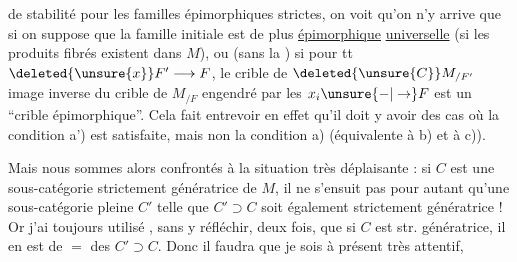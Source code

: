 de stabilité pour les familles épimorphiques
strictes, on voit qu'on n'y arrive que
si on suppose que la famille initiale
est de plus \uline{épimorphique} \uline{universelle}
(si les produits fibrés existent dans $M$),
ou (sans la  ) si  pour
tt $\deleted{\unsure{x}}F'\longrightarrow F$, le crible de $\deleted{\unsure{C}}M_{/F'}$ image
inverse du crible de $M_{/F}$ engendré par
les $x_i\unsure{\mathord{-}|\to}F$ est un ``crible épimorphique''.
 Cela fait entrevoir en effet qu'il doit
y avoir des cas où la condition a') est
satisfaite, mais non la condition a)
(équivalente à b) et à c)).

Mais nous sommes alors confrontés
à la situation très déplaisante : si $C$ est
une sous-catégorie strictement génératrice de
$M$, il ne s'ensuit pas pour autant qu'une
sous-catégorie pleine $C'$   telle que $C'\supset C$
soit également strictement génératrice !
Or j'ai toujours utilisé , sans y réfléchir,
deux fois, que si $C$ est  str. génératrice,
il en est de $=$ des $C'\supset C$. Donc il
faudra que je sois à présent très attentif,
